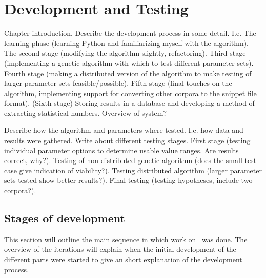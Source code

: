 
\chapter{Development and Testing} %

\label{Development} %



Chapter introduction. Describe the development process in some detail. I.e. The learning phase (learning Python and familiarizing myself with the algorithm). The second stage (modifying the algorithm slightly, refactoring). Third stage (implementing a genetic algorithm with which to test different parameter sets). Fourth stage (making a distributed version of the algorithm to make testing of larger parameter sets feasible/possible). Fifth stage (final touches on the algorithm, implementing support for converting other corpora to the snippet file format). (Sixth stage) Storing results in a database and developing a method of extracting statistical numbers. Overview of system?

Describe how the algorithm and parameters where tested. I.e. how data and results were gathered. Write about different testing stages. First stage (testing individual parameter options to determine usable value ranges. Are results correct, why?). Testing of non-distributed genetic algorithm (does the small test-case give indication of viability?). Testing distributed algorithm (larger parameter sets tested show better results?). Final testing (testing hypotheses, include two corpora?).

\section{Stages of development}
This section will outline the main sequence in which work on \theartefact\ was done.
The overview of the iterations will explain when the initial development of
the different parts were started to give an short explanation of the development process.

